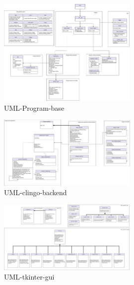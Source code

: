 \documentclass[12pt,a4paper]{article}
\newcommand{\<}[1]{\guilsinglleft}
\renewcommand{\>}[1]{\guilsinglright}
\begin{document}
\begin{figure}[ht]
    \begin{center}
    \includegraphics[width=0.6\textwidth]{imgs/pt-V4-class-diag-program-base.png}
    \caption{UML-Program-base}
    \label{fig:pt-v4-uml-program-base}
    \end{center}
\end{figure}

\begin{figure}[ht]
    \begin{center}
    \includegraphics[width=0.6\textwidth]{imgs/pt-V4-class-diag-clingo-backend.png}
    \caption{UML-clingo-backend}
    \label{fig:pt-V4-uml-clingo-backend}
    \end{center}
\end{figure}

\begin{figure}[ht]
    \begin{center}
    \includegraphics[width=0.6\textwidth]{imgs/pt-V4-class-diag-tkinter-gui.png}
    \caption{UML-tkinter-gui}
    \label{fig:pt-V4-uml-tkinter-gui}
    \end{center}
\end{figure}






%
%
\end{document}
